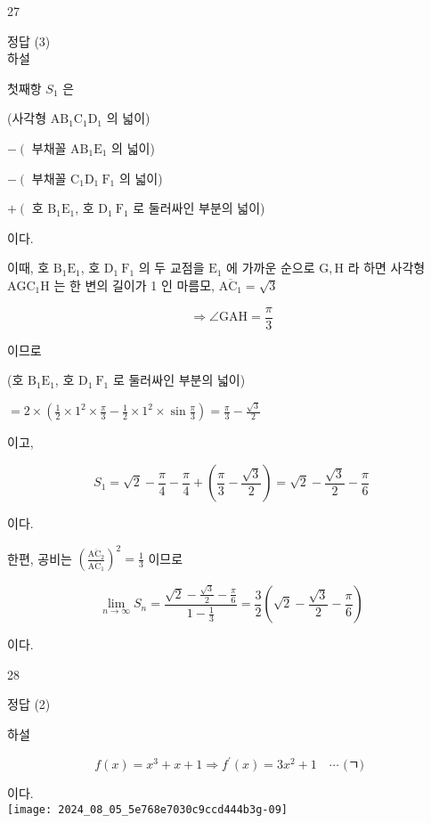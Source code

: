 \documentclass[10pt]{article}
\begin{document}
27

정답 (3)\\
하설

첫째항 \(S_{1}\) 은

(사각형 \(\mathrm{AB}_{1} \mathrm{C}_{1} \mathrm{D}_{1}\) 의 넓이)

\(-\left(\right.\) 부채꼴 \(\mathrm{AB}_{1} \mathrm{E}_{1}\) 의 넓이)

\(-\left(\right.\) 부채꼴 \(\mathrm{C}_{1} \mathrm{D}_{1} \mathrm{~F}_{1}\) 의 넓이)

\(+\left(\right.\) 호 \(\mathrm{B}_{1} \mathrm{E}_{1}\), 호 \(\mathrm{D}_{1} \mathrm{~F}_{1}\) 로 둘러싸인 부분의 넓이)

이다.

이때, 호 \(\mathrm{B}_{1} \mathrm{E}_{1}\), 호 \(\mathrm{D}_{1} \mathrm{~F}_{1}\) 의 두 교점을 \(\mathrm{E}_{1}\) 에 가까운 순으로 \(\mathrm{G}, \mathrm{H}\) 라 하면 사각형 \(\mathrm{AGC}_{1} \mathrm{H}\) 는 한 변의 길이가 1 인 마름모, \(\overline{\mathrm{AC}_{1}}=\sqrt{3}\)

\[
\Rightarrow \angle \mathrm{GAH}=\frac{\pi}{3}
\]

이므로

(호 \(\mathrm{B}_{1} \mathrm{E}_{1}\), 호 \(\mathrm{D}_{1} \mathrm{~F}_{1}\) 로 둘러싸인 부분의 넓이)

\(=2 \times\left(\frac{1}{2} \times 1^{2} \times \frac{\pi}{3}-\frac{1}{2} \times 1^{2} \times \sin \frac{\pi}{3}\right)=\frac{\pi}{3}-\frac{\sqrt{3}}{2}\)

이고,

\[
S_{1}=\sqrt{2}-\frac{\pi}{4}-\frac{\pi}{4}+\left(\frac{\pi}{3}-\frac{\sqrt{3}}{2}\right)=\sqrt{2}-\frac{\sqrt{3}}{2}-\frac{\pi}{6}
\]

이다.

한편, 공비는 \(\left(\frac{\overline{\mathrm{AC}_{2}}}{\overline{\mathrm{AC}_{1}}}\right)^{2}=\frac{1}{3}\) 이므로

\[
\lim _{n \rightarrow \infty} S_{n}=\frac{\sqrt{2}-\frac{\sqrt{3}}{2}-\frac{\pi}{6}}{1-\frac{1}{3}}=\frac{3}{2}\left(\sqrt{2}-\frac{\sqrt{3}}{2}-\frac{\pi}{6}\right)
\]

이다.

28

정답 (2)

하설

\[
f(x)=x^{3}+x+1 \Rightarrow f^{\prime}(x)=3 x^{2}+1 \quad \cdots \text { (ㄱ) }
\]

이다.\\
\texttt{[image: 2024\_08\_05\_5e768e7030c9ccd444b3g-09]}
\end{document}
